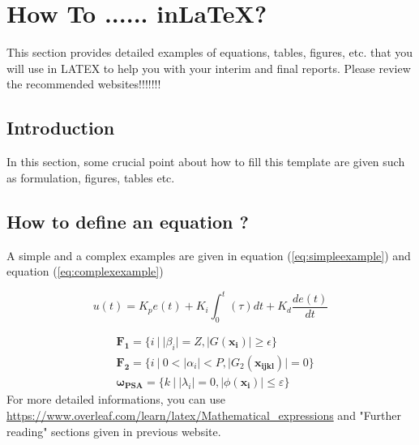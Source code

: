 \doublespacing %

\chapter{How To ...... in\LaTeX ?}
\label{chHT}

\begin{spacing}{1} %
\minitoc %
\end{spacing} %
\thesisspacing %

{\color{red}This section provides detailed examples of equations, tables, figures, etc. that you will use in LATEX to help you with your interim and final reports. Please review the recommended websites!!!!!!!}

\section{Introduction}

In this section, some crucial point about how to fill this template are given such as formulation, figures, tables etc.

\section{How to define an equation ?}
\medskip
A simple and a complex examples are given in equation (\ref{eq:simpleexample}) and equation (\ref{eq:complexexample})

\begin{equation}
    u(t) = K_p e \left( t\right) + K_i \int_0^t \left( \tau\right) dt + K_d \frac{d e \left( t\right)}{dt}
    \label{eq:simpleexample}
\end{equation}

%
%
\begin{equation}
\begin{split}
& \mathbf{F_1}=\{i \ | \ |\beta_i|=Z, |G\left(\mathbf{x_i}\right)|\geq \epsilon \} \\
& \mathbf{F_2}=\{i \ | \ 0< |\alpha_i|<P, |G_2\left(\mathbf{x_{ijkl}}\right)|=0  \} \\ 
& \mathbf{\omega_{PSA}}=\{k \ | \ |\lambda_i|=0, | \phi\left(\mathbf{x_i}\right)|\leq \varepsilon  \}
\end{split}
\label{eq:complexexample}
\end{equation}
%
%
For more detailed informations, you can use \url{https://www.overleaf.com/learn/latex/Mathematical_expressions} and "Further reading" sections given in previous website.
%
%

